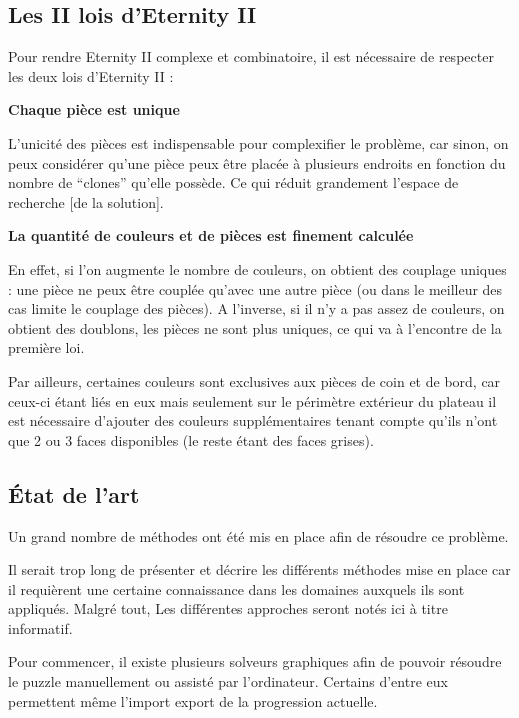 	\subsection{Les II lois d'Eternity II}
	
	Pour rendre Eternity II complexe et combinatoire, il est nécessaire de respecter les deux lois d'Eternity II :
	
	\begin{law}
		\textbf{Chaque pièce est unique}
		
		L'unicité des pièces est indispensable pour complexifier le problème, car sinon, on peux considérer qu'une pièce peux être placée à plusieurs endroits en fonction du nombre de \enquote{clones} qu'elle possède. Ce qui réduit grandement l'espace de recherche [de la solution].
	\end{law}

	\begin{law}
		\textbf{La quantité de couleurs et de pièces est finement calculée}
		
		En effet, si l'on augmente le nombre de couleurs, on obtient des couplage uniques : une pièce ne peux être couplée qu'avec une autre pièce (ou dans le meilleur des cas limite le couplage des pièces). A l'inverse, si il n'y a pas assez de couleurs, on obtient des doublons, les pièces ne sont plus uniques, ce qui va à l'encontre de la première loi.
		
		Par ailleurs, certaines couleurs sont exclusives aux pièces de coin et de bord, car ceux-ci étant liés en eux mais seulement sur le périmètre extérieur du plateau il est nécessaire d'ajouter des couleurs supplémentaires tenant compte qu'ils n'ont que 2 ou 3 faces disponibles (le reste étant des faces grises).
	\end{law}
	\newpage
	
	\subsection{État de l'art}
	
	Un grand nombre de méthodes ont été mis en place afin de résoudre ce problème.
	
	Il serait trop long de présenter et décrire les différents méthodes mise en place car il requièrent une certaine connaissance dans les domaines auxquels ils sont appliqués. Malgré tout, Les différentes approches seront notés ici à titre informatif.
	
	Pour commencer, il existe plusieurs solveurs graphiques afin de pouvoir résoudre le puzzle manuellement ou assisté par l'ordinateur. Certains d'entre eux permettent même l'import export de la progression actuelle.
	
